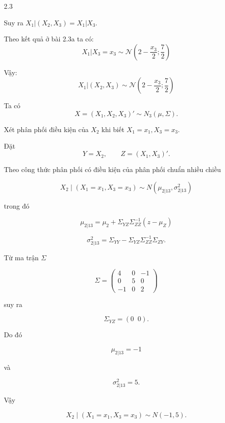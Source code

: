 \begin{question}{2.3}
\begin{subquestion}
\begin{answer}
Suy ra $X_1 | (X_2, X_3) = X_1 | X_3$.

Theo kết quả ở bài 2.3a ta có: 
$$ X_1 | X_3 = x_3 \sim \mathcal{N} \left( 2 - \frac{x_3}{2}; \frac{7}{2} \right) $$

Vậy:
$$ X_1 | (X_2, X_3) \sim \mathcal{N} \left( 2 - \frac{x_3}{2}; \frac{7}{2} \right) $$

\end{answer}
\end{subquestion}

\begin{subquestion}
\begin{answer}

Ta có
\[
X = (X_1,X_2,X_3)' \sim N_3(\mu,\Sigma).
\]

Xét phân phối điều kiện của $X_2$ khi biết $X_1=x_1, X_3=x_3$.

Đặt
\[
Y=X_2, \qquad Z=(X_1,X_3)'.
\]

Theo công thức phân phối có điều kiện của phân phối chuẩn nhiều chiều

\[
X_2 \mid (X_1=x_1,X_3=x_3) 
\sim N(\mu_{2|13}, \sigma^2_{2|13})
\]

trong đó

\[
\mu_{2|13}=\mu_2+\Sigma_{YZ}\Sigma_{ZZ}^{-1}(z-\mu_Z)
\]

\[
\sigma^2_{2|13}=\Sigma_{YY}-\Sigma_{YZ}\Sigma_{ZZ}^{-1}\Sigma_{ZY}.
\]

Từ ma trận $\Sigma$

\[
\Sigma=
\begin{pmatrix}
4&0&-1\\
0&5&0\\
-1&0&2
\end{pmatrix}
\]

suy ra

\[
\Sigma_{YZ}=(0\;\;0).
\]

Do đó

\[
\mu_{2|13}=-1
\]

và

\[
\sigma^2_{2|13}=5.
\]

Vậy

\[
X_2 \mid (X_1=x_1,X_3=x_3) \sim N(-1,5).
\]

\end{answer}
\end{subquestion}

\end{question}
